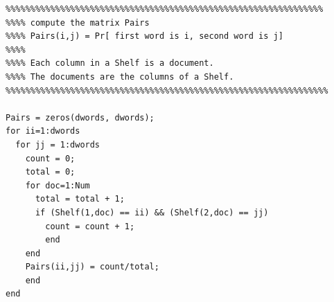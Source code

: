 \documentclass[11pt]{article}
\begin{document}
\begin{verbatim}
%%%%%%%%%%%%%%%%%%%%%%%%%%%%%%%%%%%%%%%%%%%%%%%%%%%%%%%%%%%%%%%%
%%%% compute the matrix Pairs
%%%% Pairs(i,j) = Pr[ first word is i, second word is j]
%%%%
%%%% Each column in a Shelf is a document.
%%%% The documents are the columns of a Shelf.
%%%%%%%%%%%%%%%%%%%%%%%%%%%%%%%%%%%%%%%%%%%%%%%%%%%%%%%%%%%%%%%%%

Pairs = zeros(dwords, dwords);
for ii=1:dwords
  for jj = 1:dwords
    count = 0;
    total = 0;
    for doc=1:Num
      total = total + 1;
      if (Shelf(1,doc) == ii) && (Shelf(2,doc) == jj)
        count = count + 1;
        end
    end
    Pairs(ii,jj) = count/total;
    end
end
\end{verbatim}
\end{document}
